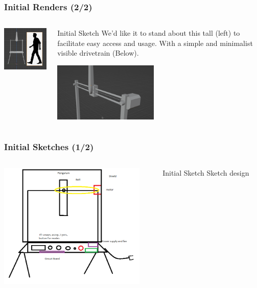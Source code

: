 \documentclass[aspectratio=169]{beamer}
\begin{document}
\begin{frame}
    \frametitle{Initial Renders (2/2)}

    \begin{columns}
        \begin{column}{0.48\textwidth}
            \includegraphics[width=5cm]{Scale}
        \end{column}
        \begin{column}{0.48\textwidth}
            \begin{block}{Initial Sketch}
                We'd like it to stand about this tall (left) to facilitate easy access
                and usage. With a simple and minimalist visible drivetrain (Below).
            \end{block}
            \includegraphics[width=5cm]{UpperAssy}
        \end{column}
    \end{columns}

\end{frame}

\begin{frame}
    \frametitle{Initial Sketches (1/2)}

    \begin{columns}
        \begin{column}{0.48\textwidth}
            \includegraphics[width=7cm]{../../Notes/Sketches/Basic Mock-Up Sketch.png}
        \end{column}
        \begin{column}{0.48\textwidth}
            \begin{block}{Initial Sketch}
                Sketch design
            \end{block}
        \end{column}
    \end{columns}
\end{frame}
\end{document}
